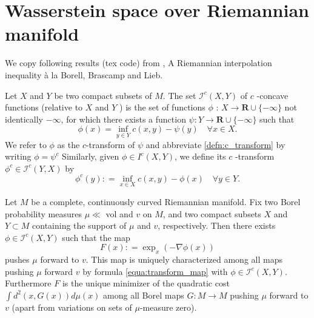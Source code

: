 \chapter{Wasserstein space over Riemannian manifold}

We copy following results (tex code) from \cite{cordero2001riemannian},
A Riemannian interpolation inequality à la Borell, Brascamp and Lieb.
\begin{defn} 
	Let \( X \) and \( Y \) be two compact subsets of \( M \). The set \( \mathcal{I} ^ { c } ( X , Y ) \) of \( c \) -concave functions (relative to \( X \) and \( Y \) ) is the set of functions \( \phi \) : \( X \rightarrow \mathbf { R } \cup \{ - \infty \} \) not identically \( - \infty \), for which there exists a function \( \psi : Y \rightarrow \mathbf { R } \cup \{ - \infty \} \) such that
	\begin{equation}
		\label{defn:c_transform}
		\phi ( x ) = \inf _ { y \in Y } c ( x , y ) - \psi ( y ) \quad \forall x \in X.
	\end{equation}
	We refer to \( \phi \) as the \( c \)-transform of \( \psi \) and abbreviate \cref{defn:c_transform} by writing \( \phi = \psi ^ { c } \)
	Similarly, given \( \phi \in I ^ { c } ( X , Y ) \), we define its \( c \) -transform \( \phi ^ { c } \in \mathcal{I} ^ { c } ( Y , X ) \) by
	\[ \phi ^ { c } ( y ) : = \inf _ { x \in X } c ( x , y ) - \phi ( x ) \quad \forall y \in Y. \]
\end{defn}

\begin{thm}
	Let \( M \) be a complete, continuously curved Riemannian manifold. Fix two Borel probability measures \( \mu \ll \) vol and \( v \) on \( M \), and two compact subsets \( X \) and \( Y \subset M \) containing the support of \( \mu \) and \( v \), respectively. Then there exists \( \phi \in \mathcal { I } ^ { c } ( X , Y ) \) such that the map
	\begin{equation}
		\label{equa:transform_map}
		F ( x ) : = \exp _ { x } ( - \nabla \phi ( x ) )
	\end{equation}
	pushes \( \mu \) forward to \( v \). This map is uniquely characterized among all maps pushing \( \mu \) forward \( v \) by formula \cref{equa:transform_map} with \( \phi \in \mathcal{I} ^ { c } ( X , Y ) . \) Furthermore \( F \) is the unique minimizer of the quadratic cost \( \int d ^ { 2 } ( x , G ( x ) ) d \mu ( x ) \) among all Borel maps \( G : M \rightarrow M \) pushing \( \mu \) forward to \( v \) (apart from variations on sets of \( \mu \)-measure zero).
\end{thm}

